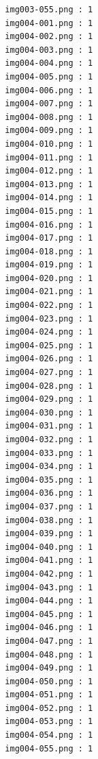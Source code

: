 \documentclass[12pt,a4paper]{article}
\begin{document}
\begin{lstlisting}
                     img003-055.png : 1
                     img004-001.png : 1
                     img004-002.png : 1
                     img004-003.png : 1
                     img004-004.png : 1
                     img004-005.png : 1
                     img004-006.png : 1
                     img004-007.png : 1
                     img004-008.png : 1
                     img004-009.png : 1
                     img004-010.png : 1
                     img004-011.png : 1
                     img004-012.png : 1
                     img004-013.png : 1
                     img004-014.png : 1
                     img004-015.png : 1
                     img004-016.png : 1
                     img004-017.png : 1
                     img004-018.png : 1
                     img004-019.png : 1
                     img004-020.png : 1
                     img004-021.png : 1
                     img004-022.png : 1
                     img004-023.png : 1
                     img004-024.png : 1
                     img004-025.png : 1
                     img004-026.png : 1
                     img004-027.png : 1
                     img004-028.png : 1
                     img004-029.png : 1
                     img004-030.png : 1
                     img004-031.png : 1
                     img004-032.png : 1
                     img004-033.png : 1
                     img004-034.png : 1
                     img004-035.png : 1
                     img004-036.png : 1
                     img004-037.png : 1
                     img004-038.png : 1
                     img004-039.png : 1
                     img004-040.png : 1
                     img004-041.png : 1
                     img004-042.png : 1
                     img004-043.png : 1
                     img004-044.png : 1
                     img004-045.png : 1
                     img004-046.png : 1
                     img004-047.png : 1
                     img004-048.png : 1
                     img004-049.png : 1
                     img004-050.png : 1
                     img004-051.png : 1
                     img004-052.png : 1
                     img004-053.png : 1
                     img004-054.png : 1
                     img004-055.png : 1




\end{lstlisting}
\end{document}
